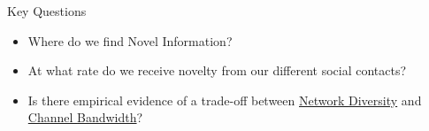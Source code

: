 \begin{frame}{{\color{violet} Key Questions}}

  \begin{itemize}
    \item Where do we find {\color{salmon}Novel} Information? 
    \item At what rate do we receive {\color{salmon}novelty} from our different social contacts?
    \item Is there empirical evidence of a trade-off between \underline{Network {\color{sred}Diversity}} and \underline{Channel {\color{turq}Bandwidth}}?
  \end{itemize}

     
    
      
    
    



\end{frame}
